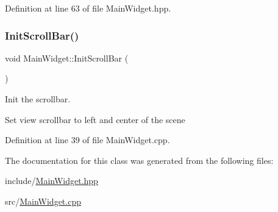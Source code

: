 Definition at line 63 of file Main\+Widget.\+hpp.

\mbox{\label{classMainWidget_af544f3b04a81d63c0810a90706773d3d}} 
\subsubsection{\texorpdfstring{Init\+Scroll\+Bar()}{InitScrollBar()}}
{\footnotesize\ttfamily void Main\+Widget\+::\+Init\+Scroll\+Bar (\begin{DoxyParamCaption}{ }\end{DoxyParamCaption})}



Init the scrollbar. 

Set view scrollbar to left and center of the scene 

Definition at line 39 of file Main\+Widget.\+cpp.



The documentation for this class was generated from the following files\+:\begin{DoxyCompactItemize}
\item 
include/\mbox{\hyperlink{MainWidget_8hpp}{Main\+Widget.\+hpp}}\item 
src/\mbox{\hyperlink{MainWidget_8cpp}{Main\+Widget.\+cpp}}\end{DoxyCompactItemize}
